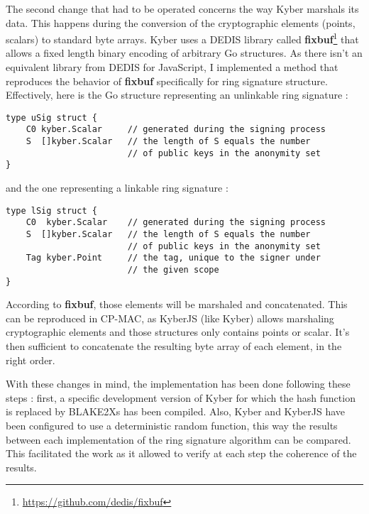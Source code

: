 The second change that had to be operated concerns the way Kyber marshals its data. This happens during the conversion of the cryptographic elements (points, scalars) to standard byte arrays. Kyber uses a DEDIS library called \textbf{fixbuf}\footnote{\url{https://github.com/dedis/fixbuf}} that allows a fixed length binary encoding of arbitrary Go structures. As there isn't an equivalent library from DEDIS for JavaScript, I implemented a method that reproduces the behavior of \textbf{fixbuf} specifically for ring signature structure. Effectively, here is the Go structure representing an unlinkable ring signature :

\begin{center}
\begin{lstlisting}[language=Golang, caption={Unlinkable ring signature structure}, label={code:ustruct}]
type uSig struct {
	C0 kyber.Scalar 	// generated during the signing process
	S  []kyber.Scalar 	// the length of S equals the number
						// of public keys in the anonymity set
}
\end{lstlisting}
\end{center}
and the one representing a linkable ring signature :
\begin{center}
\begin{lstlisting}[language=Golang, caption={Linkable ring signature structure}, label={code:lstruct}]
type lSig struct {
	C0  kyber.Scalar 	// generated during the signing process
	S  []kyber.Scalar 	// the length of S equals the number
						// of public keys in the anonymity set
	Tag kyber.Point 	// the tag, unique to the signer under 
						// the given scope
}
\end{lstlisting}
\end{center}
According to \textbf{fixbuf}, those elements will be marshaled and concatenated. This can be reproduced in CP-MAC, as KyberJS (like Kyber) allows mar\-shaling cryptographic elements and those structures only contains points or scalar. It's then sufficient to concatenate the resulting byte array of each element, in the right order.

With these changes in mind, the implementation has been done following these steps : first, a specific development version of Kyber for which the hash function is replaced by BLAKE2Xs has been compiled. Also, Kyber and KyberJS have been configured to use a deterministic random function, this way the results between each implementation of the ring signature algorithm can be compared. This facilitated the work as it allowed to verify at each step the coherence of the results.
